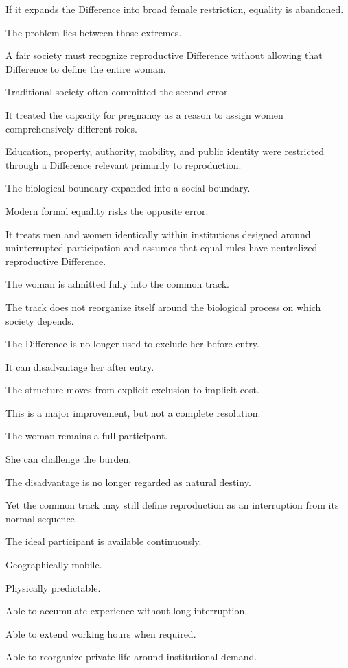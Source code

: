 If it expands the Difference into broad female restriction, equality is abandoned.

The problem lies between those extremes.

A fair society must recognize reproductive Difference without allowing that Difference to define the entire woman.

Traditional society often committed the second error.

It treated the capacity for pregnancy as a reason to assign women comprehensively different roles.

Education, property, authority, mobility, and public identity were restricted through a Difference relevant primarily to reproduction.

The biological boundary expanded into a social boundary.

Modern formal equality risks the opposite error.

It treats men and women identically within institutions designed around uninterrupted participation and assumes that equal rules have neutralized reproductive Difference.

The woman is admitted fully into the common track.

The track does not reorganize itself around the biological process on which society depends.

The Difference is no longer used to exclude her before entry.

It can disadvantage her after entry.

The structure moves from explicit exclusion to implicit cost.

This is a major improvement, but not a complete resolution.

The woman remains a full participant.

She can challenge the burden.

The disadvantage is no longer regarded as natural destiny.

Yet the common track may still define reproduction as an interruption from its normal sequence.

The ideal participant is available continuously.

Geographically mobile.

Physically predictable.

Able to accumulate experience without long interruption.

Able to extend working hours when required.

Able to reorganize private life around institutional demand.

